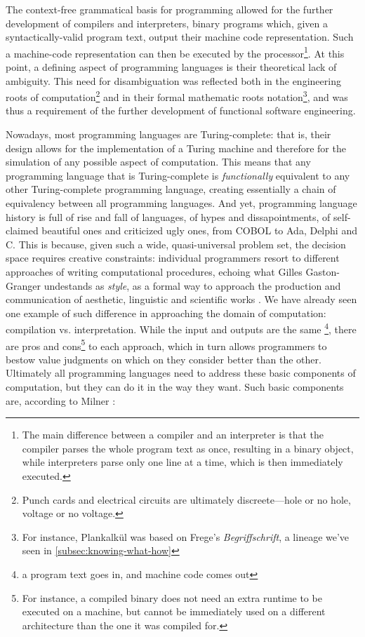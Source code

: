 The context-free grammatical basis for programming allowed for the further development of compilers and interpreters, binary programs which, given a syntactically-valid program text, output their machine code representation. Such a machine-code representation can then be executed by the processor\footnote{The main difference between a compiler and an interpreter is that the compiler parses the whole program text as once, resulting in a binary object, while interpreters parse only one line at a time, which is then immediately executed.}. At this point, a defining aspect of programming languages is their theoretical lack of ambiguity. This need for disambiguation was reflected both in the engineering roots of computation\footnote{Punch cards and electrical circuits are ultimately discreete—hole or no hole, voltage or no voltage.} and in their formal mathematic roots notation\footnote{For instance, Plankalkül was based on Frege's \emph{Begriffschrift}, a lineage we've seen in \ref{subsec:knowing-what-how}}, and was thus a requirement of the further development of functional software engineering.

Nowadays, most programming languages are Turing-complete: that is, their design allows for the implementation of a Turing machine and therefore for the simulation of any possible aspect of computation. This means that any programming language that is Turing-complete is \emph{functionally} equivalent to any other Turing-complete programming language, creating essentially a chain of equivalency between all programming languages. And yet, programming language history is full of rise and fall of languages, of hypes and dissapointments, of self-claimed beautiful ones and criticized ugly ones, from COBOL to Ada, Delphi and C. This is because, given such a wide, quasi-universal problem set, the decision space requires creative constraints: individual programmers resort to different approaches of writing computational procedures, echoing what Gilles Gaston-Granger undestands as \emph{style}, as a formal way to approach the production and communication of aesthetic, linguistic and scientific works \citep{granger_essai_1988}. We have already seen one example of such difference in approaching the domain of computation: compilation vs. interpretation. While the input and outputs are the same \footnote{a program text goes in, and machine code comes out}, there are pros and cons\footnote{For instance, a compiled binary does not need an extra runtime to be executed on a machine, but cannot be immediately used on a different architecture than the one it was compiled for.} to each approach, which in turn allows programmers to bestow value judgments on which on they consider better than the other. Ultimately all programming languages need to address these basic components of computation, but they can do it in the way they want. Such basic components are, according to Milner \citep{milner_semantic_1996}:

